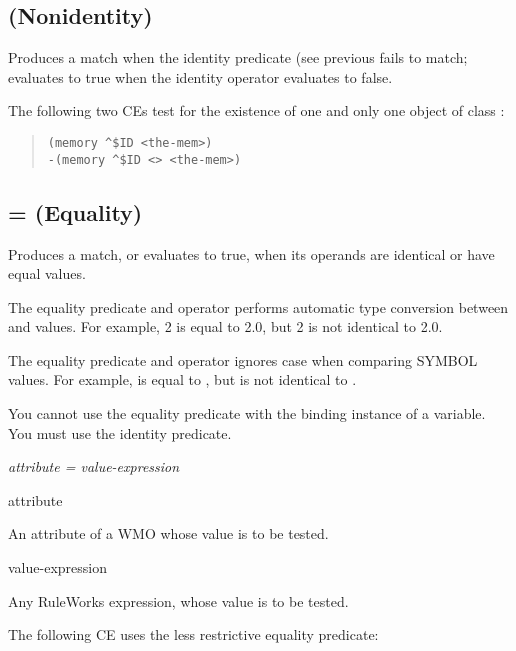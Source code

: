 \subsection{\co{<>} (Nonidentity)}

Produces a match when the identity predicate (see previous fails to
match; evaluates to true when the identity operator evaluates to
false.

\Example

The following two CEs test for the existence of one and only
one object of class :

\begin{quote}
\begin{verbatim}
(memory ^$ID <the-mem>)
-(memory ^$ID <> <the-mem>)
\end{verbatim}
\end{quote}

\subsection{\co= (Equality)}

Produces a match, or evaluates to true, when its operands are
identical or have equal values.

The equality predicate and operator performs automatic type conversion
between  and  values. For example, 2 is equal to 2.0, but
2 is not identical to 2.0.

The equality predicate and operator ignores case when comparing SYMBOL
values. For example,  is equal to , but 
is not identical to .

You cannot use the equality predicate with the binding instance of a
variable. You must use the identity predicate.

\Format

\co{\^}\it{attribute} \co= \it{value-expression}

\begin{operands}
\item[\ct attribute]

  An attribute of a WMO whose value is to be tested.

\item[value-expression]

  Any RuleWorks expression, whose value is to be tested.
\end{operands}

\Example

The following CE uses the less restrictive equality predicate:


